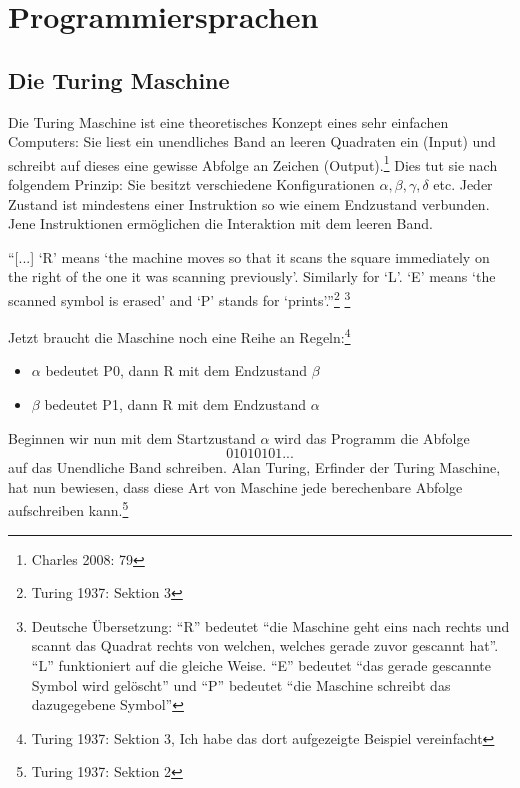 \documentclass[a4paper,12pt]{article}
\begin{document}
\section{Programmiersprachen}
\subsection{Die Turing Maschine}
Die Turing Maschine ist eine theoretisches Konzept eines sehr einfachen Computers: Sie liest ein unendliches Band an leeren Quadraten ein (Input) und schreibt auf dieses eine gewisse Abfolge an Zeichen (Output).\footnote{Charles 2008: 79} Dies tut sie nach folgendem Prinzip: Sie besitzt verschiedene Konfigurationen $\alpha, \beta, \gamma, \delta$ etc. Jeder Zustand ist mindestens einer Instruktion so wie einem Endzustand verbunden. Jene Instruktionen ermöglichen die Interaktion mit dem leeren Band. 
\begin{displayquote}
\enquote{[...] \enquote{R} means \enquote{the machine moves
so that it scans the square immediately on the right of the one it was
scanning previously}. Similarly for \enquote{L}. \enquote{E} means \enquote{the scanned
symbol is erased} and \enquote{P} stands for \enquote{prints}.}\footnote{Turing 1937: Sektion 3} \footnote{Deutsche Übersetzung: \enquote{R} bedeutet \enquote{die Maschine geht eins nach rechts und scannt das Quadrat rechts von welchen, welches gerade zuvor gescannt hat}. \enquote{L} funktioniert auf die gleiche Weise. \enquote{E} bedeutet \enquote{das gerade gescannte Symbol wird gelöscht} und \enquote{P} bedeutet \enquote{die Maschine schreibt das dazugegebene Symbol}}
\end{displayquote}
Jetzt braucht die Maschine noch eine Reihe an Regeln:\footnote{Turing 1937: Sektion 3, Ich habe das dort aufgezeigte Beispiel vereinfacht}
\begin{itemize}
    \item $\alpha$ bedeutet P0, dann R mit dem Endzustand $\beta$
    \item $\beta$ bedeutet P1, dann R mit dem Endzustand $\alpha$
\end{itemize}
Beginnen wir nun mit dem Startzustand $\alpha$ wird das Programm die Abfolge $$01010101...$$ auf das Unendliche Band schreiben. Alan Turing, Erfinder der Turing Maschine, hat nun bewiesen, dass diese Art von Maschine jede berechenbare Abfolge aufschreiben kann.\footnote{Turing 1937: Sektion 2}
\end{document}
